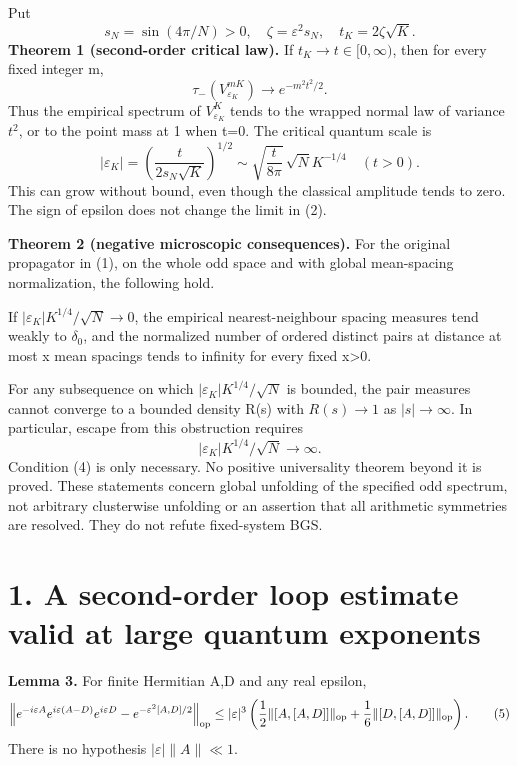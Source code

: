 \documentclass[11pt,a4paper]{article}
\begin{document}
Put \[
 s_N=\sin(4\pi/N)>0,\quad \zeta=\varepsilon^2s_N,\quad
 t_K=2\zeta\sqrt K.
\] \textbf{Theorem 1 (second-order critical law).} If \(t_K\to t\in[0,\infty)\), then for every fixed integer m, \[
 \tau_-(V_{\varepsilon_K}^{mK})\longrightarrow e^{-m^2t^2/2}.     \tag{2}
\] Thus the empirical spectrum of \(V_{\varepsilon_K}^K\) tends to the wrapped normal law of variance \(t^2\), or to the point mass at 1 when t=0. The critical quantum scale is \[
 |\varepsilon_K|=\left(\frac{t}{2s_N\sqrt K}\right)^{1/2}
 \sim\sqrt{\frac{t}{8\pi}}\,\sqrt N K^{-1/4}\quad(t>0).         \tag{3}
\] This can grow without bound, even though the classical amplitude tends to zero. The sign of epsilon does not change the limit in (2).

\textbf{Theorem 2 (negative microscopic consequences).} For the original propagator in (1), on the whole odd space and with global mean-spacing normalization, the following hold.

If \(|\varepsilon_K|K^{1/4}/\sqrt N\to0\), the empirical nearest-neighbour spacing measures tend weakly to \(\delta_0\), and the normalized number of ordered distinct pairs at distance at most x mean spacings tends to infinity for every fixed x\textgreater0.

For any subsequence on which \(|\varepsilon_K|K^{1/4}/\sqrt N\) is bounded, the pair measures cannot converge to a bounded density R(s) with \(R(s)\to1\) as \(|s|\to\infty\). In particular, escape from this obstruction requires \[
 |\varepsilon_K|K^{1/4}/\sqrt N\longrightarrow\infty.            \tag{4}
\] Condition (4) is only necessary. No positive universality theorem beyond it is proved. These statements concern global unfolding of the specified odd spectrum, not arbitrary clusterwise unfolding or an assertion that all arithmetic symmetries are resolved. They do not refute fixed-system BGS.

\hypertarget{a-second-order-loop-estimate-valid-at-large-quantum-exponents}{%
\section{1. A second-order loop estimate valid at large quantum exponents}\label{a-second-order-loop-estimate-valid-at-large-quantum-exponents}}

\textbf{Lemma 3.} For finite Hermitian A,D and any real epsilon, \[
 \left\|e^{-i\varepsilon A}e^{i\varepsilon(A-D)}e^{i\varepsilon D}
       -e^{-\varepsilon^2[A,D]/2}\right\|_{\rm op}
 \leq |\varepsilon|^3\left(
       \frac12\|[A,[A,D]]\|_{\rm op}
       +\frac16\|[D,[A,D]]\|_{\rm op}\right).                  \tag{5}
\] There is no hypothesis \(|\varepsilon|\|A\|\ll1\).
\end{document}
